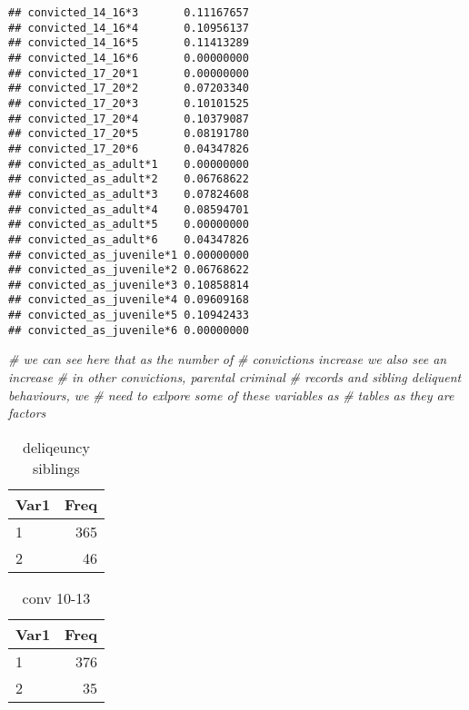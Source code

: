 \documentclass[]{tufte-handout}
\newenvironment{Shaded}{}{}
\newcommand{\CommentTok}[1]{\textcolor[rgb]{0.38,0.63,0.69}{\textit{#1}}}
\begin{document}
\begin{verbatim}
## convicted_14_16*3       0.11167657
## convicted_14_16*4       0.10956137
## convicted_14_16*5       0.11413289
## convicted_14_16*6       0.00000000
## convicted_17_20*1       0.00000000
## convicted_17_20*2       0.07203340
## convicted_17_20*3       0.10101525
## convicted_17_20*4       0.10379087
## convicted_17_20*5       0.08191780
## convicted_17_20*6       0.04347826
## convicted_as_adult*1    0.00000000
## convicted_as_adult*2    0.06768622
## convicted_as_adult*3    0.07824608
## convicted_as_adult*4    0.08594701
## convicted_as_adult*5    0.00000000
## convicted_as_adult*6    0.04347826
## convicted_as_juvenile*1 0.00000000
## convicted_as_juvenile*2 0.06768622
## convicted_as_juvenile*3 0.10858814
## convicted_as_juvenile*4 0.09609168
## convicted_as_juvenile*5 0.10942433
## convicted_as_juvenile*6 0.00000000
\end{verbatim}

\begin{Shaded}
\begin{Highlighting}[]
\CommentTok{# we can see here that as the number of}
\CommentTok{# convictions increase we also see an increase}
\CommentTok{# in other convictions, parental criminal}
\CommentTok{# records and sibling deliquent behaviours, we}
\CommentTok{# need to exlpore some of these variables as}
\CommentTok{# tables as they are factors}
\end{Highlighting}
\end{Shaded}

\begin{table}

\caption{\label{tab:tables}deliqeuncy siblings}
\centering
\begin{tabular}[t]{l|r}
\hline
Var1 & Freq\\
\hline
1 & 365\\
\hline
2 & 46\\
\hline
\end{tabular}
\end{table}

\begin{table}

\caption{\label{tab:tables}conv 10-13}
\centering
\begin{tabular}[t]{l|r}
\hline
Var1 & Freq\\
\hline
1 & 376\\
\hline
2 & 35\\
\hline
\end{tabular}
\end{table}
\end{document}

